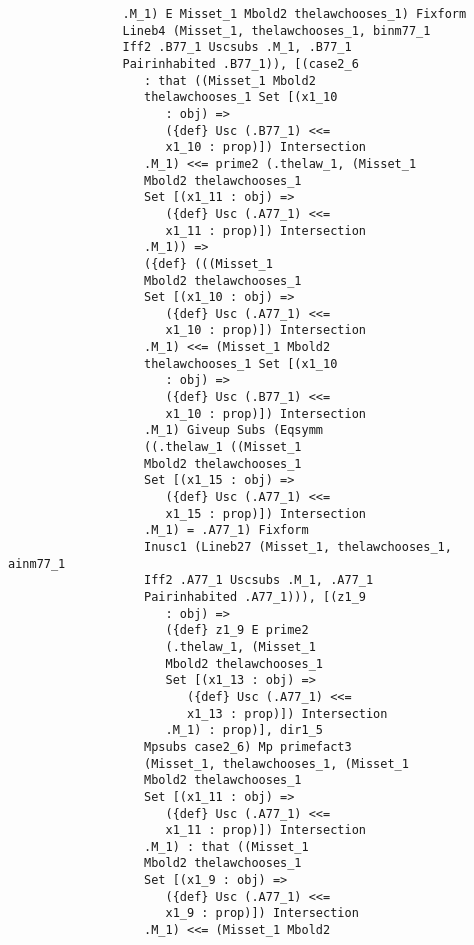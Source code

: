 \documentclass[12pt]{article}
\begin{document}
\begin{verbatim}
                .M_1) E Misset_1 Mbold2 thelawchooses_1) Fixform 
                Lineb4 (Misset_1, thelawchooses_1, binm77_1 
                Iff2 .B77_1 Uscsubs .M_1, .B77_1 
                Pairinhabited .B77_1)), [(case2_6 
                   : that ((Misset_1 Mbold2 
                   thelawchooses_1 Set [(x1_10 
                      : obj) => 
                      ({def} Usc (.B77_1) <<= 
                      x1_10 : prop)]) Intersection 
                   .M_1) <<= prime2 (.thelaw_1, (Misset_1 
                   Mbold2 thelawchooses_1 
                   Set [(x1_11 : obj) => 
                      ({def} Usc (.A77_1) <<= 
                      x1_11 : prop)]) Intersection 
                   .M_1)) => 
                   ({def} (((Misset_1 
                   Mbold2 thelawchooses_1 
                   Set [(x1_10 : obj) => 
                      ({def} Usc (.A77_1) <<= 
                      x1_10 : prop)]) Intersection 
                   .M_1) <<= (Misset_1 Mbold2 
                   thelawchooses_1 Set [(x1_10 
                      : obj) => 
                      ({def} Usc (.B77_1) <<= 
                      x1_10 : prop)]) Intersection 
                   .M_1) Giveup Subs (Eqsymm 
                   ((.thelaw_1 ((Misset_1 
                   Mbold2 thelawchooses_1 
                   Set [(x1_15 : obj) => 
                      ({def} Usc (.A77_1) <<= 
                      x1_15 : prop)]) Intersection 
                   .M_1) = .A77_1) Fixform 
                   Inusc1 (Lineb27 (Misset_1, thelawchooses_1, ainm77_1 
                   Iff2 .A77_1 Uscsubs .M_1, .A77_1 
                   Pairinhabited .A77_1))), [(z1_9 
                      : obj) => 
                      ({def} z1_9 E prime2 
                      (.thelaw_1, (Misset_1 
                      Mbold2 thelawchooses_1 
                      Set [(x1_13 : obj) => 
                         ({def} Usc (.A77_1) <<= 
                         x1_13 : prop)]) Intersection 
                      .M_1) : prop)], dir1_5 
                   Mpsubs case2_6) Mp primefact3 
                   (Misset_1, thelawchooses_1, (Misset_1 
                   Mbold2 thelawchooses_1 
                   Set [(x1_11 : obj) => 
                      ({def} Usc (.A77_1) <<= 
                      x1_11 : prop)]) Intersection 
                   .M_1) : that ((Misset_1 
                   Mbold2 thelawchooses_1 
                   Set [(x1_9 : obj) => 
                      ({def} Usc (.A77_1) <<= 
                      x1_9 : prop)]) Intersection 
                   .M_1) <<= (Misset_1 Mbold2 

\end{verbatim}
\end{document}
